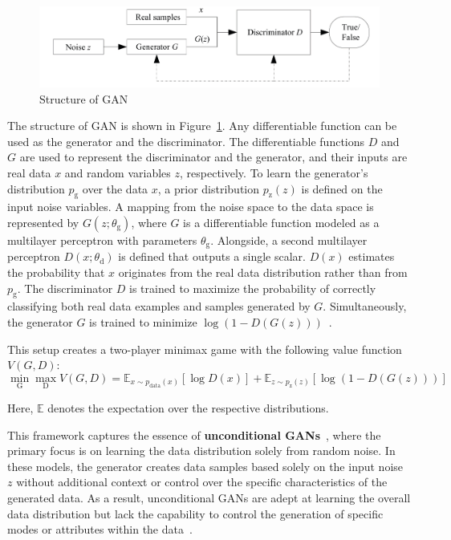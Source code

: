 \documentclass[12pt,DIV14,BCOR12mm,a4paper,footinclude=false,headinclude,parskip=half-,twoside,openright,cleardoublepage=empty,toc=index,bibliography=totoc,listof=totoc]{scrreprt}
\numberwithin{equation}{chapter}
\begin{document}
\begin{figure}
	\centering
	\includegraphics[scale=0.7]{../media/structure of GAN1.PNG}
	\caption{Structure of GAN~\cite{wang2017generative}}
	\label{GAN_struct}
\end{figure}

The structure of GAN is shown in Figure~\ref{GAN_struct}. Any differentiable function can be used as the generator and the discriminator. The differentiable functions \( D \) and \( G \) are used to represent the discriminator and the generator, and their inputs are real data \( x \) and random variables \( z \), respectively. To learn the generator's distribution \( p_{\text{g}} \) over the data \( x \), a prior distribution \( p_{\text{z}}(z) \) is defined on the input noise variables. A mapping from the noise space to the data space is represented by \( G(z; \theta_{\text{g}}) \), where \( G \) is a differentiable function modeled as a multilayer perceptron with parameters \( \theta_{\text{g}} \). Alongside, a second multilayer perceptron \( D(x; \theta_{\text{d}}) \) is defined that outputs a single scalar. \( D(x) \) estimates the probability that \( x \) originates from the real data distribution rather than from \( p_{\text{g}} \). The discriminator \( D \) is trained to maximize the probability of correctly classifying both real data examples and samples generated by \( G \). Simultaneously, the generator \( G \) is trained to minimize \( \log(1 - D(G(z))) \)~\cite{wang2017generative}. 

This setup creates a two-player minimax game with the following value function \( V(G, D) \):
\begin{equation}
\min_{\text{G}} \max_{\text{D}} V(G, D) = \mathbb{E}_{x \sim p_{\text{data}}(x)} [\log D(x)] + \mathbb{E}_{z \sim p_{\text{z}}(z)} [\log(1 - D(G(z)))]
\end{equation}

Here, \( \mathbb{E} \) denotes the expectation over the respective distributions.

This framework captures the essence of \textbf{unconditional GANs}~\cite{georgopoulos2022cluster}, where the primary focus is on learning the data distribution solely from random noise. In these models, the generator creates data samples based solely on the input noise \( z \) without additional context or control over the specific characteristics of the generated data. As a result, unconditional GANs are adept at learning the overall data distribution but lack the capability to control the generation of specific modes or attributes within the data~\cite{lee2022generator}.
\end{document}
